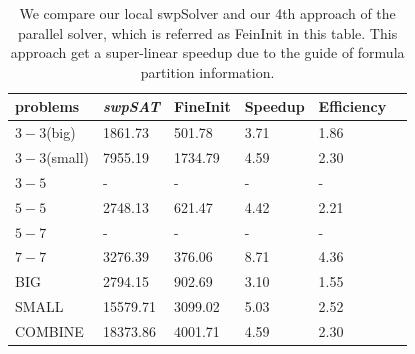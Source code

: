 \documentclass[12pt,a4paper,twoside]{scrartcl}
\numberwithin{equation}{section}
\begin{document}
\begin{table}[h!]
\begin{center}
    \begin{tabular}{|l|l|l|l|l|p{1cm}|}
\hline 
    problems &\emph{swpSAT}&FineInit&Speedup&Efficiency\\ \hline
    $3-3$(big)&1861.73 &501.78&3.71&1.86\\ \hline
    $3-3$(small)&7955.19& 1734.79& 4.59&2.30\\ \hline
    $3-5$&-&-&-&-\\ \hline
    $5-5$&2748.13&621.47&4.42&2.21\\ \hline
    $5-7$&-&-&-&-\\ \hline
    $7-7$&3276.39&376.06&8.71&4.36\\ \hline
    BIG&2794.15&902.69&3.10& 1.55\\ \hline
    SMALL&15579.71&3099.02&5.03&2.52\\ \hline
    COMBINE&18373.86&4001.71&4.59& 2.30\\ \hline
\end{tabular}
\end{center}
\caption{We compare our local swpSolver and our 4th approach of the parallel solver, which is referred as FeinInit in this table. This approach get a super-linear speedup due to the  guide of formula partition information. }
\end{table} 
\end{document}

